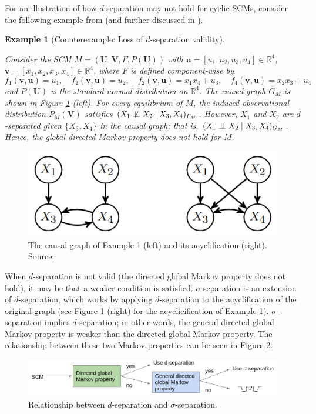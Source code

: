 \documentclass[letterpaper,10pt]{article}
\newtheorem{example}{Example}
\newcommand{\CI}{\mathrel{\perp\mspace{-10mu}\perp}}
\newcommand{\nCI}{\centernot{\CI}}
\newcommand\R{\mathbb{R}}
\begin{document}
For an illustration of how $d$-separation may not hold for cyclic SCMs, consider the following example from \cite{Acyclification} (and further discussed in \cite{Foundations}).

\begin{example}[Counterexample: Loss of $d$-separation validity]
\label{counter}

Consider the SCM $M=(\mathbf{U},\mathbf{V},F,P(\mathbf{U}))$ with $\mathbf{u}=[u_1,u_2,u_3,u_4]\in \R^4$, $\mathbf{v}=[x_1,x_2,x_3,x_4]\in\R^4$, where $F$ is defined component-wise by
\[
f_1(\mathbf{v},\mathbf{u}) = u_1, \quad f_2(\mathbf{v},\mathbf{u}) = u_2, \quad
f_2(\mathbf{v},\mathbf{u}) = x_1x_4+u_3, \quad f_4(\mathbf{v},\mathbf{u}) = x_2x_3+u_4 
\]
and $P(\mathbf{U})$ is the standard-normal distribution on $\R^4$. The causal graph $G_M$ is shown in Figure \ref{fig:acyclification} (left). For every equilibrium of $M$, the induced observational distribution $P_M(\mathbf{V})$ satisfies $(X_1 \nCI X_2 \mid X_3,X_4)_{P_M}$.
However, $X_1$ and $X_2$ are $d$-separated given $\{X_3,X_4\}$ in the causal graph; that is, $(X_1 \CI X_2 \mid X_3,X_4)_{G_M}$. 
Hence, the global directed Markov property does not hold for $M$.
\end{example}

\begin{figure}
\centering
\includegraphics[width=.4\linewidth]{pics/cited/acyclification_Foundations.png}
\caption{The causal graph of Example \ref{counter} (left) and its acyclification (right). Source: \cite{Foundations}}
\label{fig:acyclification}
\end{figure}

When $d$-separation is not valid (the directed global Markov property does not hold), it may be that a weaker condition is satisfied. $\sigma$-separation is an extension of $d$-separation, which works by applying $d$-separation to the acyclification of the original graph (see Figure \ref{fig:acyclification} (right) for the acyclicification of Example \ref{counter}). $\sigma$-separation implies $d$-separation; in other words, the general directed global Markov property is weaker than the directed global Markov property. The relationship between these two Markov properties can be seen in Figure \ref{fig:inputs-outputs}.

\begin{figure}
\centering
\includegraphics[width=.8\linewidth]{pics/my_own/inputs_outputs.png}
\caption{Relationship between $d$-separation and $\sigma$-separation.}
\label{fig:inputs-outputs}
\end{figure}
\end{document}
